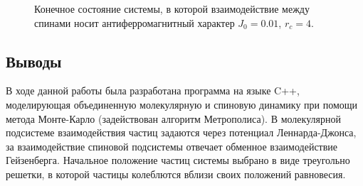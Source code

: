 \documentclass[14pt,a4paper,report]{ncc}
\begin{document}
\begin{figure}[h]
\begin{minipage}[h]{0.49\linewidth}
\end{minipage}
\hfill
\begin{minipage}[h]{0.49\linewidth}
\end{minipage}
\caption{Конечное состояние системы, в которой взаимодействие между спинами носит антиферромагнитный характер $J_0=0.01$, $r_c=4$.}
\label{ris:image19}
\end{figure}

\newpage
\subsection{Выводы}


В ходе данной работы была разработана программа на языке C++, моделирующая объединенную молекулярную и спиновую динамику при помощи метода Монте-Карло (задействован алгоритм Метрополиса). В молекулярной подсистеме взаимодействия частиц задаются через потенциал Леннарда-Джонса, за взаимодействие спиновой подсистемы отвечает обменное взаимодействие Гейзенберга. Начальное положение частиц системы выбрано в виде треугольно решетки, в которой частицы колеблются вблизи своих положений равновесия.
\
\end{document}

